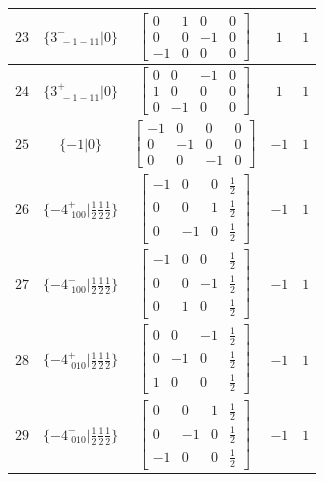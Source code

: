 \documentclass[fleqn,8pt]{jsarticle}
\begin{document}
\begin{longtable}{ccccc}
$ 23 $ & $ \{3^{-}_{\,\,-1-11}|0\} $ & $ \begin{bmatrix} 0 & 1 & 0 & 0 \\ 0 & 0 & -1 & 0 \\ -1 & 0 & 0 & 0 \end{bmatrix} $ & $ 1 $ & $ 1 $ \\ \hline
$ 24 $ & $ \{3^{+}_{\,\,-1-11}|0\} $ & $ \begin{bmatrix} 0 & 0 & -1 & 0 \\ 1 & 0 & 0 & 0 \\ 0 & -1 & 0 & 0 \end{bmatrix} $ & $ 1 $ & $ 1 $ \\ \hline
$ 25 $ & $ \{-1|0\} $ & $ \begin{bmatrix} -1 & 0 & 0 & 0 \\ 0 & -1 & 0 & 0 \\ 0 & 0 & -1 & 0 \end{bmatrix} $ & $ -1 $ & $ 1 $ \\ \hline
$ 26 $ & $ \{-4^{+}_{\,\,100}|\frac{1}{2} \frac{1}{2} \frac{1}{2}\} $ & $ \begin{bmatrix} -1 & 0 & 0 & \frac{1}{2} \\ 0 & 0 & 1 & \frac{1}{2} \\ 0 & -1 & 0 & \frac{1}{2} \end{bmatrix} $ & $ -1 $ & $ 1 $ \\ \hline
$ 27 $ & $ \{-4^{-}_{\,\,100}|\frac{1}{2} \frac{1}{2} \frac{1}{2}\} $ & $ \begin{bmatrix} -1 & 0 & 0 & \frac{1}{2} \\ 0 & 0 & -1 & \frac{1}{2} \\ 0 & 1 & 0 & \frac{1}{2} \end{bmatrix} $ & $ -1 $ & $ 1 $ \\ \hline
$ 28 $ & $ \{-4^{+}_{\,\,010}|\frac{1}{2} \frac{1}{2} \frac{1}{2}\} $ & $ \begin{bmatrix} 0 & 0 & -1 & \frac{1}{2} \\ 0 & -1 & 0 & \frac{1}{2} \\ 1 & 0 & 0 & \frac{1}{2} \end{bmatrix} $ & $ -1 $ & $ 1 $ \\ \hline
$ 29 $ & $ \{-4^{-}_{\,\,010}|\frac{1}{2} \frac{1}{2} \frac{1}{2}\} $ & $ \begin{bmatrix} 0 & 0 & 1 & \frac{1}{2} \\ 0 & -1 & 0 & \frac{1}{2} \\ -1 & 0 & 0 & \frac{1}{2} \end{bmatrix} $ & $ -1 $ & $ 1 $ \\ \hline

\end{longtable}
\end{document}
